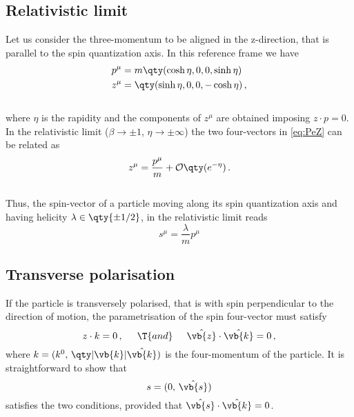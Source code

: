 \subsection*{Relativistic limit}
Let us consider the three-momentum to be aligned in the z-direction, that is parallel to the spin quantization axis. In this reference frame we have 
\\
\begin{equation}
    \begin{split}
        &p^{\mu} = m \qty(\cosh \eta,0,0,\sinh \eta) \\
        &z^{\mu} = \qty(\sinh \eta,0,0, -\cosh \eta)\,,
    \end{split}
    \label{eq:PeZ}
\end{equation}
\\
where $\eta$ is the rapidity and the components of $z^{\mu}$ are obtained imposing $z \cdot p = 0$. In the relativistic limit ($\beta \rightarrow \pm 1$, $\eta \rightarrow \pm \infty$) the two four-vectors in \eqref{eq:PeZ} can be related as
\\
\begin{equation}
    z^{\mu} = \frac{p^{\mu}}{m} + \mathcal{O}\qty(e^{-\eta})\,.  
\end{equation}
\\
Thus, the spin-vector of a particle moving along its spin quantization axis and having helicity $\lambda \in \qty{\pm 1/2}$, in the relativistic limit reads 
\\
\begin{equation}
    s^{\mu} = \frac{\lambda}{m} p^{\mu}
    \label{eq:spin:spin_vector}
\end{equation}

\subsection*{Transverse polarisation}
If the particle is transversely polarised, that is with spin perpendicular to the direction of motion, the parametrisation of the spin four-vector must satisfy
\begin{equation}
    z \cdot k = 0\,, \hspace{5mm} \T{and} \hspace{5mm} \hat{\vb{z}} \cdot \hat{\vb{k}} = 0 \,,
\end{equation}
where $k = (k^0,\, \qty|\vb{k}| \hat{\vb{k}})$ is the four-momentum of the particle. It is straightforward to show that 
\begin{equation}
    s = (0,\, \hat{\vb{s}}) 
\end{equation}
satisfies the two conditions, provided that $\hat{\vb{s}} \cdot \hat{\vb{k}} = 0$.

